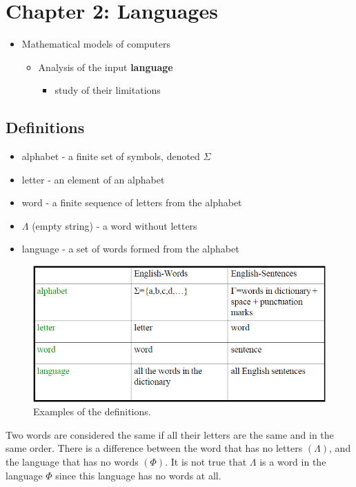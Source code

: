 \section{Chapter 2: Languages}

\begin{itemize}
    \item Mathematical models of computers
    \begin{itemize}
        \item Analysis of the input \textbf{language}
        \begin{itemize}
            \item study of their limitations
        \end{itemize}
    \end{itemize}
\end{itemize}

\subsection{Definitions}
\begin{itemize}
    \item alphabet - a finite set of symbols, denoted $\Sigma$
    \item letter - an element of an alphabet
    \item word - a finite sequence of letters from the alphabet
    \item $\Lambda$ (empty string) - a word without letters
    \item language - a set of words formed from the alphabet
\end{itemize}
\begin{figure}[!ht]
    \centering
    \includegraphics[width=\linewidth]{lectures/figures/definitions.png}
    \caption{Examples of the definitions.}
\end{figure}

Two words are considered the same if all their letters are the same and in the same order.
There is a difference between the word that has no letters $(\Lambda)$, and the language that has no words $(\Phi)$.
It is not true that $\Lambda$ is a word in the language $\Phi$ since this language has no words at all.

